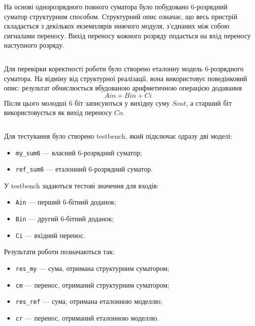 \documentclass[12pt,a4paper]{article}
\begin{document}
    \inputminted{verilog}{project/full_adder.v}

    На основі однорозрядного повного суматора було побудовано 6-розрядний суматор структурним способом. Структурний опис означає, що весь пристрій складається з декількох екземплярів нижчого модуля, з'єднаних між собою сигналами переносу. Вихід переносу кожного розряду подається на вхід переносу наступного розряду.

    \inputminted{verilog}{project/sum6bits.v}

    Для перевірки коректності роботи було створено еталонну модель 6-розрядного суматора. На відміну від структурної реалізації, вона використовує поведінковий опис: результат обчислюється вбудованою арифметичною операцією додавання
    \[
        Ain + Bin + Ci
    \]
    Після цього молодші 6 біт записуються у вихідну суму \(Sout\), а старший біт використовується як вихід переносу \(Co\).

    \inputminted{verilog}{project/ref_sum6bits.v}

    \noindent
    Для тестування було створено testbench, який підключає одразу дві моделі:
    \begin{itemize}
        \item \texttt{my\_sum6} --- власний 6-розрядний суматор;
        \item \texttt{ref\_sum6} --- еталонний 6-розрядний суматор.
    \end{itemize}

    У testbench задаються тестові значення для входів:
    \begin{itemize}
        \item \texttt{Ain} --- перший 6-бітний доданок;
        \item \texttt{Bin} --- другий 6-бітний доданок;
        \item \texttt{Ci} --- вхідний перенос.
    \end{itemize}

    Результати роботи позначаються так:
    \begin{itemize}
        \item \texttt{res\_my} --- сума, отримана структурним суматором;
        \item \texttt{cm} --- перенос, отриманий структурним суматором;
        \item \texttt{res\_ref} --- сума, отримана еталонною моделлю;
        \item \texttt{cr} --- перенос, отриманий еталонною моделлю.
    \end{itemize}
\end{document}
